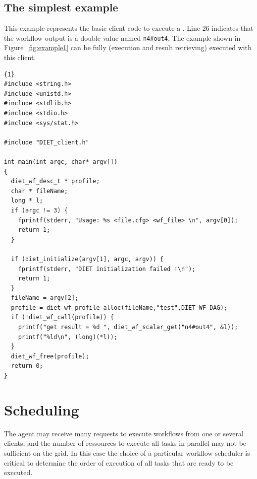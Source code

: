 \subsection{The simplest example}
\label{sec:examples}

\label{sec:ex1}

This example represents the basic client code to execute a \DAG. Line 26
indicates that the workflow output is a double value named \verb|n4#out4|. The
example shown in Figure~\ref{fig:example1} can be fully (execution and result
retrieving) executed with this client.

\begin{lstlisting}{1}
#include <string.h>
#include <unistd.h>
#include <stdlib.h>
#include <stdio.h>
#include <sys/stat.h>

#include "DIET_client.h"

int main(int argc, char* argv[])
{
  diet_wf_desc_t * profile;
  char * fileName;
  long * l;
  if (argc != 3) {
    fprintf(stderr, "Usage: %s <file.cfg> <wf_file> \n", argv[0]);
    return 1;
  }

  if (diet_initialize(argv[1], argc, argv)) {
    fprintf(stderr, "DIET initialization failed !\n");
    return 1;
  }
  fileName = argv[2];
  profile = diet_wf_profile_alloc(fileName,"test",DIET_WF_DAG);
  if (!diet_wf_call(profile)) {
    printf("get result = %d ", diet_wf_scalar_get("n4#out4", &l));
    printf("%ld\n", (long)(*l));
  }
  diet_wf_free(profile);
  return 0;
}
\end{lstlisting}

\section{Scheduling}
\label{sec:wf_sched}

The \madag agent may receive many requests to execute workflows from one or
several clients, and the number of ressources to execute all tasks in parallel
may not be sufficient on the grid. In this case the choice of a particular
workflow scheduler is critical to determine the order of execution of all tasks
that are ready to be executed.


